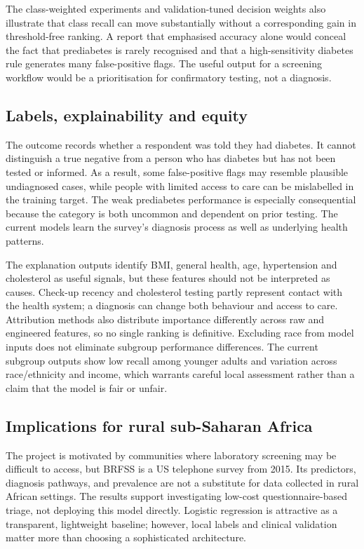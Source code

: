 The class-weighted experiments and validation-tuned decision weights also illustrate that class recall can move substantially without a corresponding gain in threshold-free ranking. A report that emphasised accuracy alone would conceal the fact that prediabetes is rarely recognised and that a high-sensitivity diabetes rule generates many false-positive flags. The useful output for a screening workflow would be a prioritisation for confirmatory testing, not a diagnosis.

\subsection{Labels, explainability and equity}
The outcome records whether a respondent was told they had diabetes. It cannot distinguish a true negative from a person who has diabetes but has not been tested or informed. As a result, some false-positive flags may resemble plausible undiagnosed cases, while people with limited access to care can be mislabelled in the training target. The weak prediabetes performance is especially consequential because the category is both uncommon and dependent on prior testing. The current models learn the survey's diagnosis process as well as underlying health patterns.

The explanation outputs identify BMI, general health, age, hypertension and cholesterol as useful signals, but these features should not be interpreted as causes. Check-up recency and cholesterol testing partly represent contact with the health system; a diagnosis can change both behaviour and access to care. Attribution methods also distribute importance differently across raw and engineered features, so no single ranking is definitive. Excluding race from model inputs does not eliminate subgroup performance differences. The current subgroup outputs show low recall among younger adults and variation across race/ethnicity and income, which warrants careful local assessment rather than a claim that the model is fair or unfair.

\subsection{Implications for rural sub-Saharan Africa}
The project is motivated by communities where laboratory screening may be difficult to access, but BRFSS is a US telephone survey from 2015. Its predictors, diagnosis pathways, and prevalence are not a substitute for data collected in rural African settings. The results support investigating low-cost questionnaire-based triage, not deploying this model directly. Logistic regression is attractive as a transparent, lightweight baseline; however, local labels and clinical validation matter more than choosing a sophisticated architecture.

